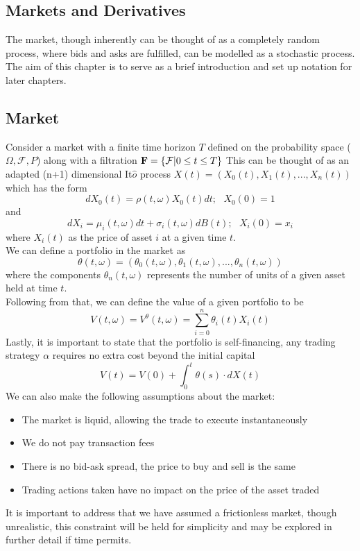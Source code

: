 \documentclass{article}
\numberwithin{equation}{section}
\begin{document}
\begin{Abstract}
\clearpage
\section{Markets and Derivatives}
The market, though inherently can be thought of as a completely random process,
where bids and asks are fulfilled, can be modelled as a stochastic process. The 
aim of this chapter is to serve as a brief introduction and set up notation for 
later chapters. \\
\subsection{Market}
Consider a market with a finite time horizon $T$ defined on the probability space 
($\Omega,\mathcal{F},P$) along with a filtration $\bold{F} = \{\mathcal{F}| 0 \leq t \leq T \}$ 
This can be thought of as an adapted (n+1) dimensional It$\hat{o}$ process 
$X(t) = (X_0(t), X_1(t),...,X_n(t))$
which has the form 
\begin{equation}
dX_0(t) = \rho(t,\omega)X_0(t)dt;\hspace{8pt}X_0(0)=1
\end{equation}and
\begin{equation}
dX_i = \mu_i(t,\omega)dt+\sigma_i(t,\omega)dB(t);\hspace{8pt}X_i(0)=x_i 
\end{equation}
where $X_i(t)$ as the price of asset $i$ at a given time $t$.
\\
We can define a portfolio in the market as 
\begin{equation}
\theta(t,\omega) = (\theta_0(t,\omega),\theta_1(t,\omega),...,\theta_n(t,\omega))
\end{equation}
where the components $\theta_n(t,\omega)$ represents the number of units of a given 
asset held at time $t$.\\
Following from that, we can define the value of a given portfolio to be 
\begin{equation}
  V(t,\omega) = V^{\theta}(t,\omega) = \sum_{i=0}^n \theta_i(t)X_i(t)
\end{equation}
Lastly, it is important to state that the portfolio is self-financing, any 
trading strategy $\alpha$ requires no extra cost beyond the initial capital
\begin{equation}
  V(t) = V(0) + \int_0^t\theta(s)\cdot dX(t)
\end{equation}
We can also make the following assumptions about the market:
\begin{itemize}
  \item The market is liquid, allowing the trade to execute instantaneously
  \item We do not pay transaction fees 
  \item There is no bid-ask spread, the price to buy and sell is the same 
  \item Trading actions taken have no impact on the price of the asset traded 
\end{itemize}
It is important to address that we have assumed a frictionless market, though 
unrealistic, this constraint will be held for simplicity and may be explored in 
further detail if time permits.



\end{Abstract}
\end{document}
